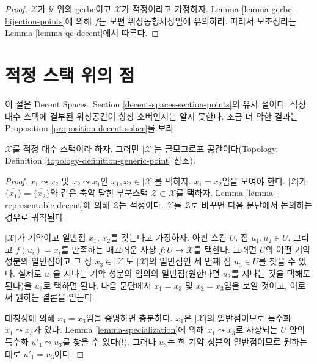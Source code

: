 \begin{proof}
$\mathcal{X}$가 $\mathcal{Y}$ 위의 gerbe이고 $\mathcal{X}$가 적정이라고
가정하자. Lemma \ref{lemma-gerbe-bijection-points}에 의해 $f$는 보편
위상동형사상임에 유의하라. 따라서 보조정리는 Lemma
\ref{lemma-qc-decent}에서 따른다.
\end{proof}



\section{적정 스택 위의 점}
\label{section-points-decent}

\noindent
이 절은 Decent Spaces, Section \ref{decent-spaces-section-points}의 유사
절이다. 적정 대수 스택에 결부된 위상공간이 항상 소버인지는 알지 못한다.
조금 더 약한 결과는 Proposition \ref{proposition-decent-sober}를 보라.

\begin{lemma}
\label{lemma-kolmogorov}
$\mathcal{X}$를 적정 대수 스택이라 하자. 그러면 $|\mathcal{X}|$는
콜모고로프 공간이다(Topology, Definition
\ref{topology-definition-generic-point} 참조).
\end{lemma}

\begin{proof}
$x_1 \leadsto x_2$ 및 $x_2 \leadsto x_1$인
$x_1, x_2 \in |\mathcal{X}|$를 택하자. $x_1 = x_2$임을 보여야 한다.
$|\mathcal{Z}|$가
$\overline{\{x_1\}} = \overline{\{x_2\}}$와 같은 축약 닫힌 부분스택
$\mathcal{Z} \subset \mathcal{X}$를 택하자. Lemma
\ref{lemma-representable-decent}에 의해 $\mathcal{Z}$는 적정이다.
$\mathcal{X}$를 $\mathcal{Z}$로 바꾸면 다음 문단에서 논의하는 경우로
귀착된다.

\medskip\noindent
$|\mathcal{X}|$가 기약이고 일반점 $x_1$, $x_2$를 갖는다고 가정하자.
아핀 스킴 $U$, 점 $u_1, u_2 \in U$, 그리고 $f(u_i) = x_i$를 만족하는
매끄러운 사상 $f : U \to \mathcal{X}$를 택한다. 그러면 $U$의 어떤 기약
성분의 일반점이고 그 상 $x_3 \in |\mathcal{X}|$도 $|\mathcal{X}|$의
일반점인 세 번째 점 $u_3 \in U$를 찾을 수 있다. 실제로 $u_1$을 지나는
기약 성분의 임의의 일반점(원한다면 $u_2$를 지나는 것을 택해도 된다)을
$u_3$로 택하면 된다. 다음 문단에서 $x_1 = x_3$ 및 $x_2 = x_3$임을
보일 것이고, 이로써 원하는 결론을 얻는다.

\medskip\noindent
대칭성에 의해 $x_1 = x_3$임을 증명하면 충분하다. $x_1$은
$|\mathcal{X}|$의 일반점이므로 특수화 $x_1 \leadsto x_3$가 있다. Lemma
\ref{lemma-specialization}에 의해 $x_1 \leadsto x_3$로 사상되는 $U$ 안의
특수화 $u'_1 \leadsto u_3$를 찾을 수 있다(!). 그러나 $u_3$는 한 기약
성분의 일반점이므로 원하는 대로 $u'_1 = u_3$이다.
\end{proof}

